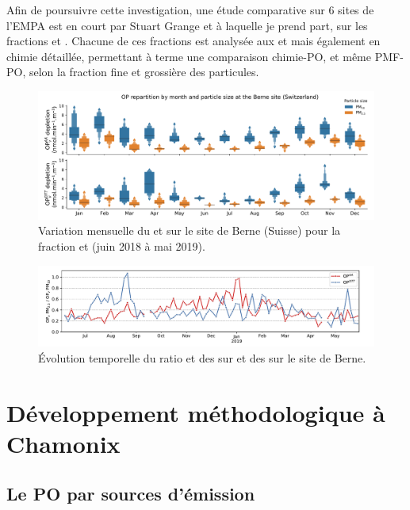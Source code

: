 Afin de poursuivre cette investigation, une étude comparative sur 6 sites de l'EMPA est
en court par Stuart Grange et à laquelle je prend part, sur les fractions \PMdix{} et
\PMdc{}. Chacune de ces fractions est analysée aux \POAA{} et \PODTT{} mais également en
chimie détaillée, permettant à terme une comparaison chimie-PO, et même PMF-PO, selon la
fraction fine et grossière des particules.

\begin{figure}[ht]
    \centering
    \includegraphics[width=1.0\linewidth]{figures/chapter04/PO_berne.pdf}
    \caption{Variation mensuelle du \POAAv{} et \PODTTv{} sur le site de Berne (Suisse)
    pour la fraction \PMdix{} et \PMdc{} (juin 2018 à mai 2019).}%
    \label{fig:PO_berne}
\end{figure}

\begin{figure}[ht]
    \centering
    \includegraphics[width=1\linewidth]{figures/chapter04/PO_berne_ratio_PM10_PM25.pdf}
    \caption{Évolution temporelle du ratio \POAAv{} et \PODTTv{} des \PMdix{} sur \POAAv{}
    et \PODTTv{} des \PMdc{} sur le site de Berne.}%
    \label{fig:PO_berne_ratio_PM10_PM25}
\end{figure}


\clearpage
\section{Développement méthodologique à Chamonix}%
\label{ssub:développement_méthodologique_à_chamonix}

\subsection{Le PO par sources d'émission}%
\label{sub:le_po_par_sources_d_émission}

